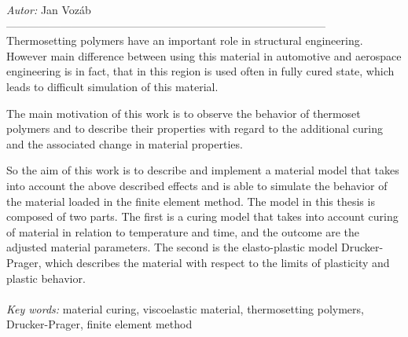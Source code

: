 \noindent
{\it Autor:} Jan Vozáb \\
 
--------------------------------------------------------------------------------------- \\

Thermosetting polymers have an important role in structural engineering. However main difference between using this material in automotive and aerospace engineering is in fact, that in this region is used often in fully cured state, which leads to difficult simulation of this material. 

The main motivation of this work is to observe the behavior of thermoset polymers and to describe their properties with regard to the additional curing and the associated change in material properties.

So the aim of this work is to describe and implement a material model that takes into account the above described effects and is able to simulate the behavior of the material loaded in the finite element method. The model in this thesis is composed of two parts. The first is a curing model that takes into account curing of material  in relation to temperature and time, and the outcome are the adjusted material parameters. The second is the elasto-plastic model Drucker-Prager, which describes the material with respect to the limits of plasticity and plastic behavior.
\\
\\

\noindent 
{\it Key words:} material curing, viscoelastic material,  thermosetting polymers, Drucker-Prager, finite element method

%
